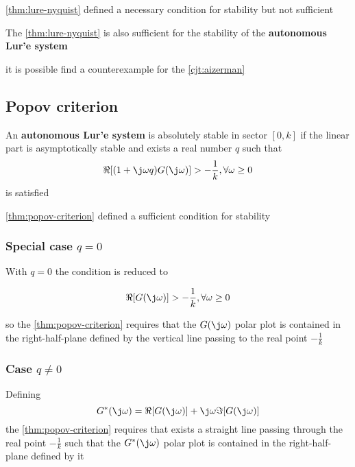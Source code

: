 \begin{nb}\cref{thm:lure-nyquist} defined a necessary condition for stability but not sufficient\end{nb}

\begin{conjecture}\label{cjt:aizerman}
    The \cref{thm:lure-nyquist} is also sufficient for the stability of the \textbf{autonomous Lur'e system}
\end{conjecture}

\begin{nb}
    it is possible find a counterexample for the \cref{cjt:aizerman}
\end{nb}

\subsection{Popov criterion}

\begin{theorem}\label{thm:popov-criterion}
    An \textbf{autonomous Lur'e system} is absolutely stable in sector $[0,k]$ if the linear part is asymptotically stable and exists a real number $q$ such that
    \[
        \Re [(1+\j \omega q) G(\j \omega)] > - \frac{1}{k}, \forall \omega \geq 0
    \]
    is satisfied
\end{theorem}

\begin{nb}\cref{thm:popov-criterion} defined a sufficient condition for stability\end{nb}

\subsubsection{Special case $q=0$}

With $q=0$ the condition is reduced to

\[
    \Re [G(\j \omega)] > - \frac{1}{k}, \forall \omega \geq 0
\]

so the \cref{thm:popov-criterion} requires that the $G(\j\omega)$ polar plot is contained in the right-half-plane defined by the vertical line passing to the real point $-\frac{1}{k}$

\subsubsection{Case $q \neq 0$}

\begin{corollary}
    Defining
    \[
        G^*(\j\omega) = \Re[G(\j\omega)] + \j\omega \Im[G(\j\omega)]
    \]
    the \cref{thm:popov-criterion} requires that exists a straight line passing through the real point $-\frac{1}{k}$ such that the $G^*(\j\omega)$ polar plot is contained in the right-half-plane defined by it
\end{corollary}
